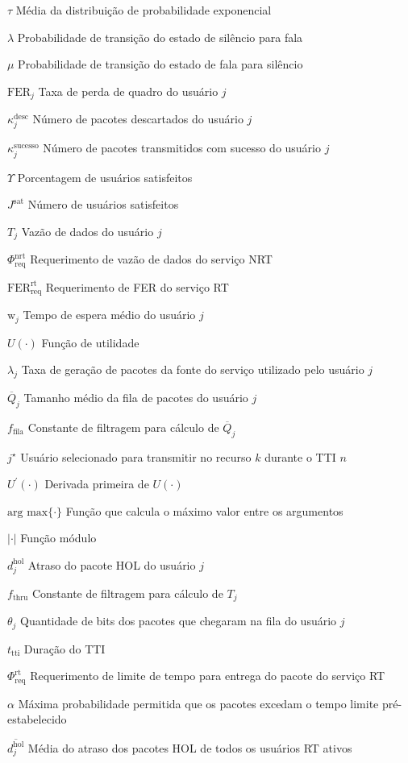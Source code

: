 \begin{simbolos}
  \item[$ \tau $] Média da distribuição de probabilidade exponencial 
  \item[$ \lambda $] Probabilidade de transição do estado de silêncio para fala
  \item[$ \mu $] Probabilidade de transição do estado de fala para silêncio
  \item[$ \mathrm{FER}_j $] Taxa de perda de quadro do usuário $j$
  \item[$ \kappa^\mathrm{desc}_j $] Número de pacotes descartados do usuário $j$
  \item[$ \kappa^\mathrm{sucesso}_j $] Número de pacotes transmitidos com sucesso do usuário $j$
  \item[$ \Upsilon $] Porcentagem de usuários satisfeitos
  \item[$ J^{\text{sat}} $] Número de usuários satisfeitos
  \item[$ T_{j} $] Vazão de dados do usuário $j$
  \item[$ \Phi_{\text{req}}^{\text{nrt}} $] Requerimento de vazão de dados do serviço NRT
  \item[$ \text{FER}_{\text{req}}^{\text{rt}} $] Requerimento de FER do serviço RT
  \item[$ \text{w}_j $] Tempo de espera médio do usuário $j$
  \item[$ U(\cdot) $] Função de utilidade
  \item[$ \lambda_j $] Taxa de geração de pacotes da fonte do serviço utilizado pelo usuário $j$
  \item[$ \overline{Q}_{j} $] Tamanho médio da fila de pacotes do usuário $j$
  \item[$ f_{\mathrm{fila}} $] Constante de filtragem para cálculo de 
  $\overline{Q}_{j}$
  \item[$ j^{\star} $] Usuário selecionado para transmitir no recurso $k$ durante o TTI $n$
  \item[$ U^{'}(\cdot) $] Derivada primeira de $U(\cdot)$
  \item[$ \text{arg max}\{\cdot\} $] Função que calcula o máximo valor entre os argumentos
  \item[$ |\cdot| $] Função módulo
  \item[$ d_{j}^{\text{hol}} $] Atraso do pacote HOL do usuário $j$
  \item[$ f_{\mathrm{thru}} $] Constante de filtragem para cálculo de 
  $T_{j}$ 
  \item[$\theta_j$] Quantidade de bits dos pacotes que chegaram na fila do usuário $j$
  \item[$ t_{\mathrm{tti}} $] Duração do TTI
  \item[$ \Phi_{\text{req}}^{\text{rt}} $] Requerimento de limite de tempo para entrega do pacote do serviço RT
  \item[$ \alpha $] Máxima probabilidade permitida que os pacotes excedam o tempo limite pré-estabelecido
  \item[$ \overline{d_{j}^{\text{hol}}} $] Média do atraso dos pacotes HOL de todos os usuários RT ativos  
  
\end{simbolos}
